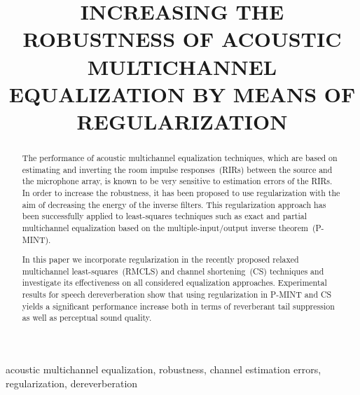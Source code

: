 \documentclass{article}
\title{INCREASING THE ROBUSTNESS OF ACOUSTIC MULTICHANNEL \\ EQUALIZATION BY MEANS OF REGULARIZATION}
\def\ninept{\def\baselinestretch{.91}\let\normalsize\small\normalsize}
\begin{document}
\ninept
%
\maketitle
%
\begin{abstract}
The performance of acoustic multichannel equalization techniques, which are based on estimating and inverting the room impulse responses~(RIRs) between the source and the microphone array, is known to be very sensitive to estimation errors of the RIRs.
In order to increase the robustness, it has been proposed to use regularization with the aim of decreasing the energy of the inverse filters. 
This regularization approach has been successfully applied to least-squares techniques such as exact and partial multichannel equalization based on the multiple-input/output inverse theorem~(P-MINT).

In this paper we incorporate regularization in the recently proposed relaxed multichannel least-squares~(RMCLS) and channel shortening~(CS) techniques and investigate its effectiveness on all considered equalization approaches. 
Experimental results for speech dereverberation show that using regularization in P-MINT and CS yields a significant performance increase  both in terms of reverberant tail suppression as well as perceptual sound quality. 


\end{abstract}
%
\begin{keywords}
acoustic multichannel equalization, robustness, channel estimation errors, regularization, dereverberation
\end{keywords}
%
\vspace{-0.1cm}
\end{document}

